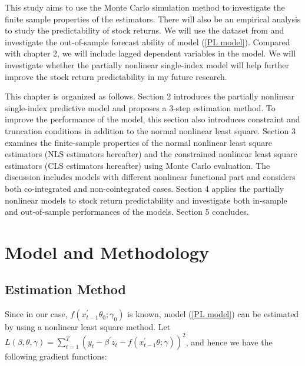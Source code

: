 \documentclass[a4paper,12pt,times,numbered,print,index]{report}
\numberwithin{equation}{section}
\begin{document}
This study aims to use the Monte Carlo simulation method to investigate the finite sample properties of the estimators. There will also be an empirical analysis to study the predictability of stock returns. We will use the dataset from \cite{welch2008comprehensive} and investigate the out-of-sample forecast ability of model (\ref{PL model}). Compared with chapter 2, we will include lagged dependent variables in the model. We will investigate whether the partially nonlinear single-index model will help further improve the stock return predictability in my future research.  

This chapter is organized as follows. Section 2 introduces the partially nonlinear single-index predictive model and proposes a 3-step estimation method. To improve the performance of the model, this section also introduces constraint and truncation conditions in addition to the normal nonlinear least square. Section 3 examines the finite-sample properties of the normal nonlinear least square estimators (NLS estimators hereafter) and the constrained nonlinear least square estimators (CLS estimators hereafter) using Monte Carlo evaluation. The discussion includes models with different nonlinear functional part and considers both co-integrated and non-cointegrated cases. Section 4 applies the partially nonlinear models to stock return predictability and investigate both in-sample and out-of-sample performances of the models. Section 5 concludes. 

%
\section{Model and Methodology}
\subsection{Estimation Method}
Since in our case, $f\left( x_{t-1}^{\prime }\theta_0; \gamma_0\right)$ is known, model (\ref{PL model}) can be estimated by using a nonlinear least square method. Let $L(\beta, \theta, \gamma) = \sum_{t=1}^{T} \left( y_t - \beta^{\prime} z_t - f\left( x_{t-1}^{\prime }\theta; \gamma\right)\right) ^2$, and hence we have the following gradient functions:
\end{document}

